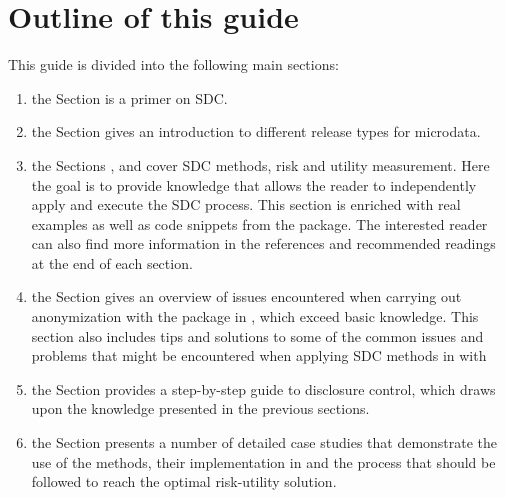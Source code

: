 \documentclass[letterpaper,10pt,english]{sphinxmanual}
\begin{document}
\section{Outline of this guide}
\label{\detokenize{intro:outline-of-this-guide}}
This guide is divided into the following main sections:
\begin{enumerate}
\item {} 
the Section  is a primer on SDC.

\item {} 
the Section  gives an introduction to different release types for
microdata.

\item {} 
the Sections  ,  and  cover SDC methods, risk and utility measurement.
Here the goal is to provide knowledge that allows the reader to
independently apply and execute the SDC process. This section is
enriched with real examples as well as code snippets from the
 package. The interested reader can also find more
information in the references and recommended readings at the end
of each section.

\item {} 
the Section  gives an overview of issues encountered when carrying
out anonymization with the  package in , which exceed
basic  knowledge. This section also includes tips and solutions
to some of the common issues and problems that might be
encountered when applying SDC methods in  with 

\item {} 
the Section  provides a step-by-step guide to disclosure control,
which draws upon the knowledge presented in the previous sections.

\item {} 
the Section  presents a number of detailed case studies that
demonstrate the use of the methods, their implementation in
 and the process that should be followed to reach the
optimal risk-utility solution.

\end{enumerate}
\end{document}
